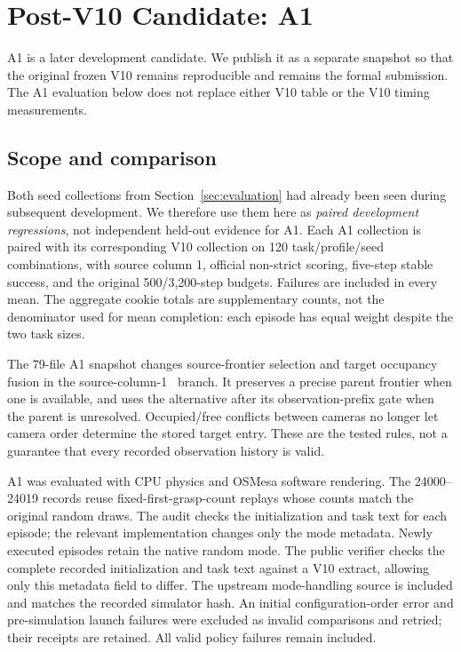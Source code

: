 \section{Post-V10 Candidate: A1}
\label{sec:a1}
A1 is a later development candidate. We publish it as a separate snapshot so that the original frozen V10 remains reproducible and remains the formal submission. The A1 evaluation below does not replace either V10 table or the V10 timing measurements.

\subsection{Scope and comparison}
Both seed collections from Section~\ref{sec:evaluation} had already been seen during subsequent development. We therefore use them here as \emph{paired development regressions}, not independent held-out evidence for A1. Each A1 collection is paired with its corresponding V10 collection on 120 task/profile/seed combinations, with source column 1, official non-strict scoring, five-step stable success, and the original 500/3,200-step budgets. Failures are included in every mean. The aggregate cookie totals are supplementary counts, not the denominator used for mean completion: each episode has equal weight despite the two task sizes.

The 79-file A1 snapshot changes source-frontier selection and target occupancy fusion in the source-column-1 \pTen\ branch. It preserves a precise parent frontier when one is available, and uses the alternative after its observation-prefix gate when the parent is unresolved. Occupied/free conflicts between cameras no longer let camera order determine the stored target entry. These are the tested rules, not a guarantee that every recorded observation history is valid.

A1 was evaluated with CPU physics and OSMesa software rendering. The 24000--24019 records reuse fixed-first-grasp-count replays whose counts match the original random draws. The audit checks the initialization and task text for each episode; the relevant implementation changes only the mode metadata. Newly executed episodes retain the native random mode. The public verifier checks the complete recorded initialization and task text against a V10 extract, allowing only this metadata field to differ. The upstream mode-handling source is included and matches the recorded simulator hash. An initial configuration-order error and pre-simulation launch failures were excluded as invalid comparisons and retried; their receipts are retained. All valid policy failures remain included.

